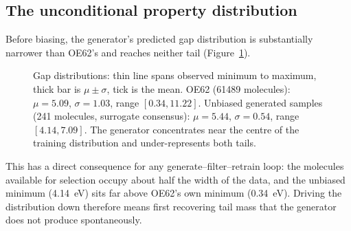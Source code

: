 \documentclass[runningheads]{llncs}
\begin{document}
\subsection{The unconditional property distribution}

Before biasing, the generator's predicted gap distribution is
substantially narrower than OE62's and reaches neither tail
(Figure~\ref{fig:dist}).

\begin{figure}[t]
\centering
{}
\caption{Gap distributions: thin line spans observed
minimum to maximum, thick bar is $\mu\pm\sigma$, tick is the mean.
OE62 (\num{61489} molecules): $\mu=5.09$, $\sigma=1.03$, range
$[0.34,11.22]$. Unbiased generated samples (\num{241} molecules,
surrogate consensus): $\mu=5.44$, $\sigma=0.54$, range $[4.14,7.09]$.
The generator concentrates near the centre of the training distribution
and under-represents both tails.}
\label{fig:dist}
\end{figure}

This has a direct consequence for any generate--filter--retrain loop:
the molecules available for selection occupy about half the width of the
data, and the unbiased minimum (\SI{4.14}{\electronvolt}) sits far above
OE62's own minimum (\SI{0.34}{\electronvolt}). Driving the distribution
down therefore means first recovering tail mass that the generator does
not produce spontaneously.
\end{document}

